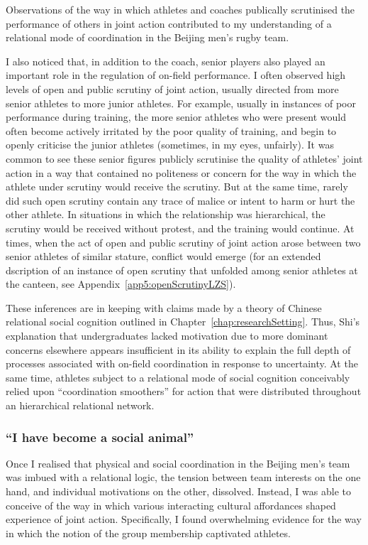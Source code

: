 \begin{CJK}{UTF8}{gbsn}
Observations of the way in which athletes and coaches publically  scrutinised the performance of others in joint action contributed to my understanding of a relational mode of coordination in the Beijing men's rugby team.

I also noticed that, in addition to the coach, senior players also played an important role in the regulation of on-field performance.
I often observed high levels of open and public scrutiny of joint action, usually directed from more senior athletes to more junior athletes.  For example, usually in instances of poor performance during training, the more senior athletes who were present would often become actively irritated by the poor quality of training, and begin to openly criticise the junior athletes (sometimes, in my eyes, unfairly).  It was common to see these senior figures publicly scrutinise the quality of athletes' joint action in a way that contained no politeness or concern for the way in which the athlete under scrutiny would receive the scrutiny. But at the same time, rarely did such open scrutiny contain any trace of malice or intent to harm or hurt the other athlete. In situations in which the relationship was hierarchical, the scrutiny would be received without protest, and the training would continue.   At times, when the act of open and public scrutiny of joint action arose between two senior athletes of similar stature, conflict would emerge (for an extended dscription of an instance of open scrutiny that unfolded among senior athletes at the canteen, see Appendix~\ref{app5:openScrutinyLZS}).

These inferences are in keeping with claims made by a theory of Chinese relational social cognition outlined in Chapter~\ref{chap:researchSetting}.  Thus, Shi's explanation that undergraduates lacked motivation due to more dominant concerns elsewhere appears insufficient in its ability to explain the full depth of processes associated with on-field coordination in response to uncertainty.  At the same time, athletes subject to a relational mode of social cognition conceivably relied upon ``coordination smoothers'' for action that were distributed throughout an hierarchical relational network.



 \subsubsection{``I have become a social animal''\label{sect:socialAnimal}}
Once I realised that physical and social coordination in the Beijing men's team was imbued with a relational logic, the tension between team interests on the one hand, and individual motivations on the other, dissolved. Instead, I was able to conceive of the way in which various interacting cultural affordances shaped experience of joint action.  Specifically, I found overwhelming evidence for the way in which the notion of the group membership captivated athletes.


\end{CJK}
